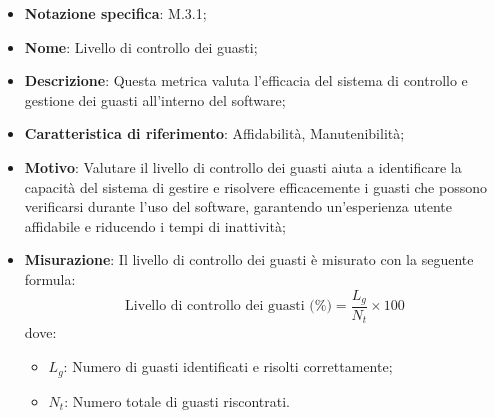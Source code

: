 \begin{itemize}
    \item \textbf{Notazione specifica}: M.3.1;
    \item \textbf{Nome}: Livello di controllo dei guasti;
    \item \textbf{Descrizione}: Questa metrica valuta l'efficacia del sistema di controllo e gestione dei guasti all'interno del software;
    \item \textbf{Caratteristica di riferimento}: Affidabilità, Manutenibilità;
    \item \textbf{Motivo}: Valutare il livello di controllo dei guasti aiuta a identificare la capacità del sistema di gestire e risolvere efficacemente i guasti che possono verificarsi durante l'uso del software, garantendo un'esperienza utente affidabile e riducendo i tempi di inattività;
    \item \textbf{Misurazione}: Il livello di controllo dei guasti è misurato con la seguente formula: 
    \[
        \text{Livello di controllo dei guasti (\%)} =\frac{L_{g}}{N_{t}} \times 100 
    \]
    dove:
    \begin{itemize}
        \item $L_{g}$: Numero di guasti identificati e risolti correttamente;
        \item $N_{t}$: Numero totale di guasti riscontrati.
    \end{itemize}
    
\end{itemize}
